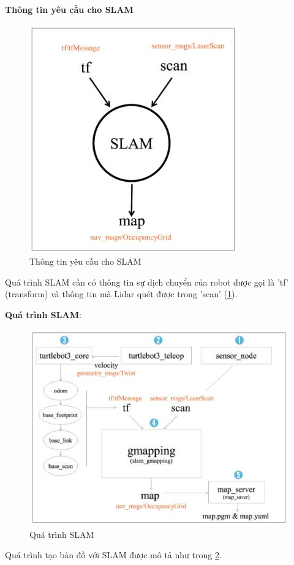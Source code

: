 \textbf{Thông tin yêu cầu cho SLAM}\\
\begin{figure}[tph]
	\centering
	\includegraphics[width=0.5\linewidth]{chapter2/figs/slam_requiredInfo}
	\caption{Thông tin yêu cầu cho SLAM}
	\label{fig:slamrequiredinfo}
\end{figure}
Quá trình SLAM cần có thông tin sự dịch chuyển của robot được gọi là 'tf' (transform) và thông tin mà Lidar quét được trong 'scan' (\figurename{\ref{fig:slamrequiredinfo}}).

\textbf{Quá trình SLAM}:\\
\begin{figure}[tph]
	\centering
	\includegraphics[width=0.7\linewidth]{chapter2/figs/slam_flowChart}
	\caption{Quá trình SLAM}
	\label{fig:slamflowchart}
\end{figure}

Quá trình tạo bản đồ với SLAM được mô tả như trong \figurename{\ref{fig:slamflowchart}}.


